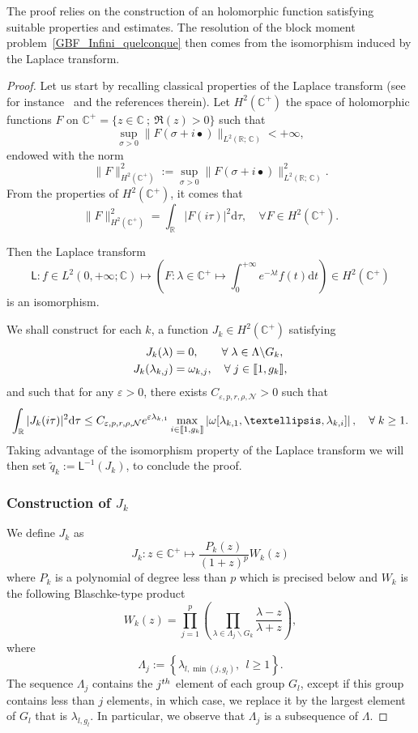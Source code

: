\documentclass[11pt]{article}
\theoremstyle{definition}
\numberwithin{equation}{section}
\numberwithin{figure}{section}
\numberwithin{table}{section}
\newcommand{\llbracket}{\mathopen{[\mkern -2.7mu[}}
\newcommand{\rrbracket}{\mathclose{]\mkern -2.7mu]}}
\newcommand{\inter}[2]{\llbracket #1,#2 \rrbracket}
\newcommand{\n}{g}
\newcommand{\NN}{\mathcal{N}}
\newcommand{\R}{\mathbb{R}}
\newcommand{\C}{\mathbb{C}}
\newcommand{\md}{\mathrm{d}}
\renewcommand{\cdot}{{\scriptstyle \bullet}}
\let\oldforall\forall
\renewcommand*{\forall}{\mathrel{\oldforall}}
\begin{document}
The proof relies on the construction of an holomorphic function satisfying suitable properties and estimates. The resolution of the block moment problem~\eqref{GBF_Infini_quelconque} then comes from the isomorphism induced by the Laplace transform.
\begin{proof}
Let us start by recalling classical properties of the Laplace transform (see for instance~\cite[pp.~19-20]{SchwartzThese} and the references therein). Let $H^2(\C^+)$ the space of holomorphic functions $F$ on $\C^+ = \{ z \in \C \: ; \: \Re(z) >0 \}$ such that
\[
\sup_{\sigma >0 } \| F(\sigma + i \cdot) \|_{L^2(\R ;\,\C)} < + \infty,
\]
endowed with the norm
\[
\| F \|_{H^2(\C^+)}^2 := \sup_{\sigma >0 } \| F(\sigma + i \cdot) \|^2_{L^2(\R ;\,\C)}.
\]
From the properties of $H^2(\C^+)$, it comes that
\[
\| F \|_{H^2(\C^+)}^2 = \int_\R | F(i \tau)|^2 \md \tau, \quad \forall F \in H^2(\C^+).
\]


\goodbreak
Then the Laplace transform
\[
\mathsf{L} : f \in L^2(0,+\infty ; \C) \mapsto \left(F : \lambda \in \C^+ \mapsto \int_0^{+\infty} e^{-\lambda t } f(t) \md t \right) \in H^2(\C^+)
\]
is an isomorphism.

We shall construct for each $k$, a function $J_k \in H^2(\C^+)$ satisfying
\begin{align}\label{ProprietesJk1}
J_k(\lambda) &= 0, \qquad \forall \lambda \in \Lambda \backslash G_k,
\\
J_k(\lambda_{k,j}) &= \omega_{k,j}, \quad \forall j \in \inter{1}{\n_k},\label{ProprietesJk2}
\end{align}
and such that for any $\varepsilon >0$, there exists $C_{\varepsilon, p, r, \rho, \NN}>0$ such that
\[
\int_\R | J_k(i \tau)|^2 \md \tau \leq C_{\varepsilon, p, r, \rho, \NN} e^{\varepsilon \lambda_{k,1}} \max \limits_{i\in \inter{1}{\n_k}} \left| \omega[\lambda_{k,1}, \dots, \lambda_{k,i}] \right|, \quad \forall k \geq 1.
\]
Taking advantage of the isomorphism property of the Laplace transform we will then set $\widetilde{q}_k := \mathsf{L}^{-1} (J_k)$, to conclude the proof.


\subsubsection{Construction of $J_k$}
We define $J_k$ as
\begin{equation*}\label{Forme_Jk}
J_k : z \in \C^+ \mapsto \frac{P_k(z)}{(1+z)^p} W_k(z)
\end{equation*}
where $P_k$ is a polynomial of degree less than $p$ which is precised below and $W_k$ is the following Blaschke-type product
\[
W_k(z) = \prod_{j=1}^p \left(\prod_{\lambda \in \Lambda_j \backslash G_k} \frac{\lambda-z}{\lambda+z}\right),
\]
where
\begin{equation}\label{def_Lambda_j}
\Lambda_j:=\left\{\lambda_{l,\min(j,\n_l)},\ \ l\geq 1\right\}.
\end{equation}
The sequence $\Lambda_j$ contains the $j^{\rm th}$ element of each group $G_l$, except if this group contains less than $j$ elements, in which case, we replace it by the largest element of $G_l$ that is $\lambda_{l,\n_l}$. In particular, we observe that $\Lambda_j$ is a subsequence of $\Lambda$.



\end{proof}
\end{document}
